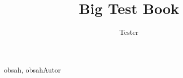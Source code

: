 \documentclass[chorded, onesongcolumn]{velkyzpevnik}
\title{Big Test Book}
\author{Tester}
\begin{document}
\insertindex

\begin{songs}{obsah, obsahAutor}

    
    
    \beginkeeporder %
    
    
    \endkeeporder
    
    

\end{songs}
\end{document}
